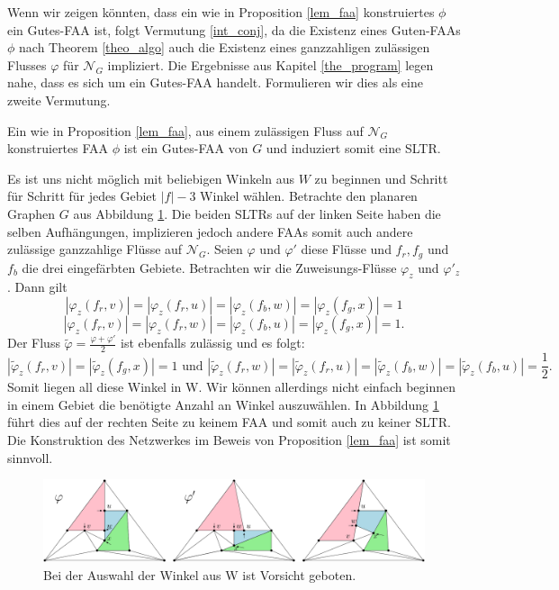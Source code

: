 Wenn wir zeigen könnten, dass ein wie in Proposition \ref{lem_faa} konstruiertes $\phi$ ein Gutes-FAA ist, folgt Vermutung \ref{int_conj}, da die Existenz eines Guten-FAAs $\phi$ nach Theorem \ref{theo_algo} auch die Existenz eines ganzzahligen zulässigen Flusses $\varphi$ für $\mathcal{N}_G$ impliziert. Die Ergebnisse aus Kapitel \ref{the_program} legen nahe, dass es sich um ein Gutes-FAA handelt. Formulieren wir dies als eine zweite Vermutung.

\begin{conjecture}\label{conj_faa}
Ein wie in Proposition \ref{lem_faa}, aus einem zulässigen Fluss auf $\mathcal{N}_G$ konstruiertes FAA $\phi$ ist ein Gutes-FAA von $G$ und induziert somit eine SLTR.
\end{conjecture}

\begin{example}
Es ist uns nicht möglich mit beliebigen Winkeln aus $W$ zu beginnen und Schritt für Schritt für jedes Gebiet $|f|-3$ Winkel wählen. Betrachte den planaren Graphen $G$ aus Abbildung \ref{lem_faa_choice_ex}. Die beiden SLTRs auf der linken Seite haben die selben Aufhängungen, implizieren jedoch andere FAAs somit auch andere zulässige ganzzahlige Flüsse auf $\mathcal{N}_G$. Seien $\varphi$ und $\varphi'$ diese Flüsse und $f_{r},f_{g}$ und $f_b$ die drei eingefärbten Gebiete. Betrachten wir die Zuweisungs-Flüsse $\varphi_z$ und $\varphi'_z$. Dann gilt $$|\varphi_z(f_r,v)|=|\varphi_z(f_r,u)|=|\varphi_z(f_b,w)| = |\varphi_z(f_g,x)| = 1$$
$$|\varphi_z(f_r,v)|=|\varphi_z(f_r,w)|=|\varphi_z(f_b,u)| = |\varphi_z(f_g,x)| = 1.$$
Der Fluss $\tilde{\varphi}=\frac{\varphi+\varphi'}{2}$ ist ebenfalls zulässig und es folgt:
$$|\tilde{\varphi}_z(f_r,v)|=|\tilde{\varphi}_z(f_g,x)| = 1 \text{ und } |\tilde{\varphi}_z(f_r,w)|=|\tilde{\varphi}_z(f_r,u)| = |\tilde{\varphi}_z(f_b,w)|=|\tilde{\varphi}_z(f_b,u)| = \frac{1}{2}.$$
Somit liegen all diese Winkel in W. Wir können allerdings nicht einfach beginnen in einem Gebiet die benötigte Anzahl an Winkel auszuwählen. In Abbildung \ref{lem_faa_choice_ex} führt dies auf der rechten Seite zu keinem FAA und somit auch zu keiner SLTR. Die Konstruktion des Netzwerkes im Beweis von Proposition \ref{lem_faa} ist somit sinnvoll.

\begin{figure}[h]
	\centering
  	\includegraphics[width=1\textwidth]{lem_faa_choice_ex.png}
  	\caption{Bei der Auswahl der Winkel aus W ist Vorsicht geboten.}
	\label{lem_faa_choice_ex}
\end{figure}
\end{example}

